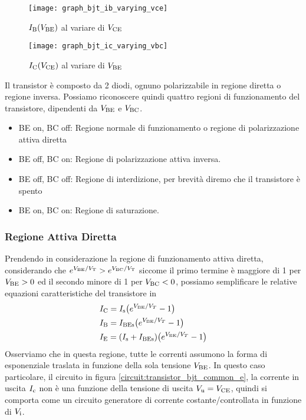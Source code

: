 \documentclass[../elettronica]{subfiles}
\begin{document}
\newpage
\begin{figure}[h]
\begin{minipage}{.47\textwidth}
    \centering
    \texttt{[image: graph\_bjt\_ib\_varying\_vce]}
    \caption{$\I{B}(\V{BE})$ al variare di $\V{CE}$}
    \label{graph:transistor_bjt_3d}
\end{minipage}
\begin{minipage}{.47\textwidth}
    \centering
    \texttt{[image: graph\_bjt\_ic\_varying\_vbc]}
    \caption{$\I{C}(\V{CE})$ al variare di $\V{BE}$}
    \label{graph:transistor_bjt_3d_2}
\end{minipage}
\end{figure}

\vspace{20pt}
\noindent Il transistor è composto da 2 diodi, ognuno polarizzabile in regione diretta o regione inversa. Possiamo riconoscere quindi
quattro regioni di funzionamento del transistore, dipendenti da $\V{BE}$ e $\V{BC}$.
\begin{itemize}
    \item BE on, BC off: Regione normale di funzionamento o regione di polarizzazione attiva diretta
    \item BE off, BC on: Regione di polarizzazione attiva inversa.
    \item BE off, BC off: Regione di interdizione, per brevità diremo che il transistore è spento
    \item BE on, BC on: Regione di saturazione.
\end{itemize}

\subsubsection{Regione Attiva Diretta}
Prendendo in considerazione la regione di funzionamento attiva diretta, considerando che $e^{\V{BE} / \V{T}} > e^{\V{BC}/{\V{T}}}$
siccome il primo termine è maggiore di 1 per $\V{BE} > 0$ ed il secondo minore di 1 per $\V{BC} < 0$, possiamo semplificare le relative
equazioni caratteristiche del transistore in
\begin{align*}
    &\I{C} = \diodecurrent[\I{s}]{\V{BE}}\\
    &\I{B} = \diodecurrent[\I{BEs}]{\V{BE}}\\
    &\I{E} = \diodecurrent[(\I{s} + \I{BEs})]{\V{BE}}
\end{align*}
Osserviamo che in questa regione, tutte le correnti assumono la forma di esponenziale traslata in funzione della sola tensione $\V{BE}$.
In questo caso particolare, il circuito in figura \ref{circuit:transistor_bjt_common_e}, la corrente in uscita $\I{c}$ non è una funzione della tensione
di uscita $\V{u} = \V{CE}$, quindi si comporta come un circuito generatore di corrente costante/controllata in funzione di $\V{i}$.
\end{document}
